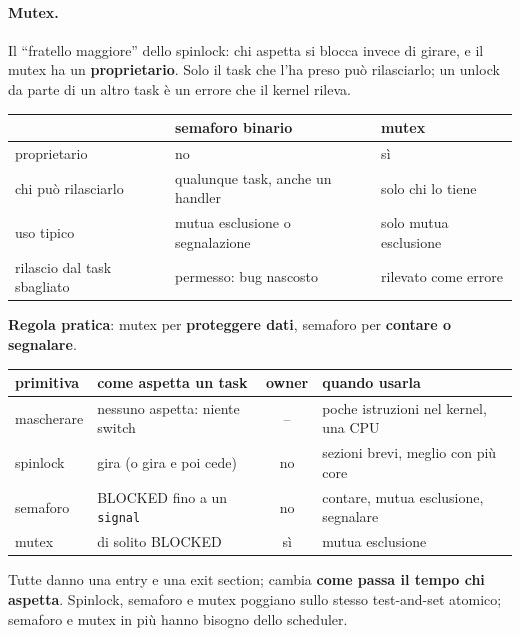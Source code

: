 \paragraph*{Mutex.} Il ``fratello maggiore'' dello spinlock: chi aspetta si blocca invece di girare, e il mutex ha un \textbf{proprietario}. Solo il task che l'ha preso può rilasciarlo; un unlock da parte di un altro task è un errore che il kernel rileva.
\begin{center}
\small
\begin{tabular}{P{0.28} P{0.32} P{0.32}}
    \hline
    & \textbf{semaforo binario} & \textbf{mutex} \\
    \hline
    proprietario & no & sì \\
    chi può rilasciarlo & qualunque task, anche un handler & solo chi lo tiene \\
    uso tipico & mutua esclusione o segnalazione & solo mutua esclusione \\
    rilascio dal task sbagliato & permesso: bug nascosto & rilevato come errore \\
    \hline
\end{tabular}
\end{center}
\textbf{Regola pratica}: mutex per \textbf{proteggere dati}, semaforo per \textbf{contare o segnalare}.

\begin{center}
\small
\begin{tabular}{P{0.17} P{0.27} c P{0.3}}
    \hline
    \textbf{primitiva} & \textbf{come aspetta un task} & \textbf{owner} & \textbf{quando usarla} \\
    \hline
    mascherare & nessuno aspetta: niente switch & -- & poche istruzioni nel kernel, una CPU \\
    spinlock & gira (o gira e poi cede) & no & sezioni brevi, meglio con più core \\
    semaforo & BLOCKED fino a un \texttt{signal} & no & contare, mutua esclusione, segnalare \\
    mutex & di solito BLOCKED & sì & mutua esclusione \\
    \hline
\end{tabular}
\end{center}
Tutte danno una entry e una exit section; cambia \textbf{come passa il tempo chi aspetta}. Spinlock, semaforo e mutex poggiano sullo stesso test-and-set atomico; semaforo e mutex in più hanno bisogno dello scheduler.

